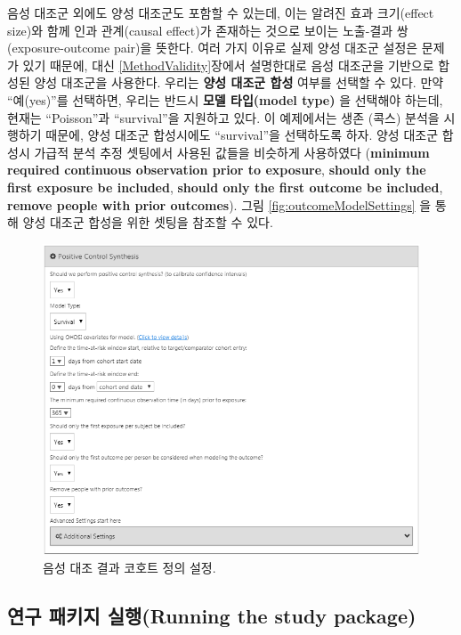 \documentclass[11pt]{book}
\theoremstyle{definition}
\theoremstyle{definition}
\theoremstyle{definition}
\theoremstyle{remark}
\begin{document}
음성 대조군 외에도 양성 대조군도 포함할 수 있는데, 이는 알려진 효과
크기(effect size)와 함께 인과 관계(causal effect)가 존재하는 것으로
보이는 노출-결과 쌍(exposure-outcome pair)을 뜻한다. 여러 가지 이유로
실제 양성 대조군 설정은 문제가 있기 때문에, 대신
\ref{MethodValidity}장에서 설명한대로 음성 대조군을 기반으로 합성된 양성
대조군을 사용한다. 우리는 \textbf{양성 대조군 합성} 여부를 선택할 수
있다. 만약 ``예(yes)''를 선택하면, 우리는 반드시 \textbf{모델 타입(model
type)} 을 선택해야 하는데, 현재는 ``Poisson''과 ``survival''을 지원하고
있다. 이 예제에서는 생존 (콕스) 분석을 시행하기 때문에, 양성 대조군
합성시에도 ``survival''을 선택하도록 하자. 양성 대조군 합성시 가급적
분석 추정 셋팅에서 사용된 값들을 비슷하게 사용하였다 (\textbf{minimum
required continuous observation prior to exposure}, \textbf{should only
the first exposure be included}, \textbf{should only the first outcome
be included}, \textbf{remove people with prior outcomes}). 그림
\ref{fig:outcomeModelSettings} 을 통해 양성 대조군 합성을 위한 셋팅을
참조할 수 있다.

\begin{figure}

{\centering \includegraphics[width=1\linewidth]{images/PopulationLevelEstimation/pcSynthesis} 

}

\caption{음성 대조 결과 코호트 정의 설정.}\label{fig:pcSynthesis}
\end{figure}

\subsection{연구 패키지 실행(Running the study
package)}\label{--running-the-study-package}
\end{document}
